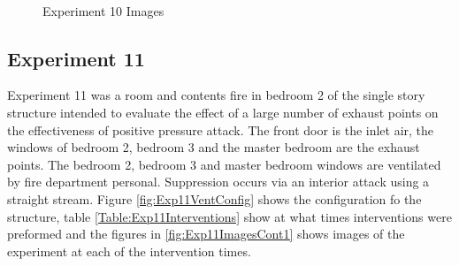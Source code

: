 \documentclass{article}
\begin{document}
\begin{figure}[H]
	\ContinuedFloat 
	\centering 
	 \ 
	 \ 
	\caption{Experiment 10 Images}
	\label{fig:Experiment10ImagesCont3} 
\end{figure}

\subsection{Experiment 11}
Experiment 11 was a room and contents fire in bedroom 2 of the single story structure intended to evaluate the effect of a large number of exhaust points on the effectiveness of positive pressure attack. The front door is the inlet air, the windows of bedroom 2, bedroom 3 and the master bedroom are the exhaust points. The bedroom 2, bedroom 3 and master bedroom windows are ventilated by fire department personal. Suppression occurs via an interior attack using a straight stream. Figure \ref{fig:Exp11VentConfig} shows the configuration fo the structure, table \ref{Table:Exp11Interventions} show at what times interventions were preformed and the figures in \ref{fig:Exp11ImagesCont1} shows images of the experiment at each of the intervention times.
\end{document}
